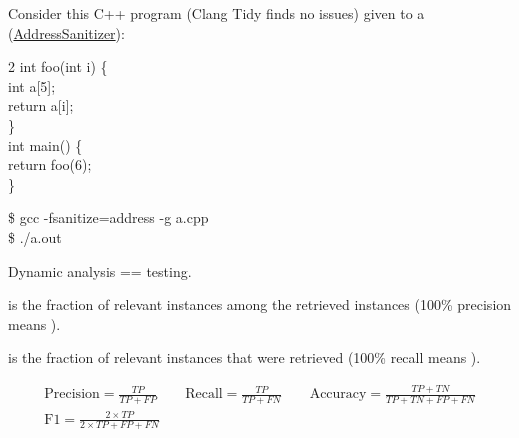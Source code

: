 \documentclass{article}
\begin{document}
\plush{}


Consider this C++ program (Clang Tidy finds no issues) given to a 
(\href{https://en.wikipedia.org/wiki/Code_sanitizer}{AddressSanitizer}):

\begin{pptWideOne}
\begin{multicols}{2}
{\ttfamily
int foo(int i) \{ \\
\quad int a[5]; \\
\quad return a[i]; \\
\} \\
int main() \{ \\
\quad return foo(6); \\
\}}
\par\columnbreak\par
{\ttfamily
\$ gcc -fsanitize=address -g a.cpp \\
\$ ./a.out}

\end{multicols}
\end{pptWideOne}

Dynamic analysis == testing.

\plush{}




\plush{}


 is the fraction of relevant instances among the retrieved instances (100\% precision means ).

 is the fraction of relevant instances that were retrieved (100\% recall means ).

\begin{pptWideOne}
\begin{gather*}
\text{Precision} = \frac{TP}{TP + FP}
\quad\quad
\text{Recall} = \frac{TP}{TP + FN}
\quad\quad
\text{Accuracy} = \frac{TP + TN}{TP + TN + FP + FN}
\\[12pt]
\text{F1} = \frac{2 \times TP}{2 \times TP + FP + FN}
\\
\end{gather*}
\end{pptWideOne}
\end{document}
